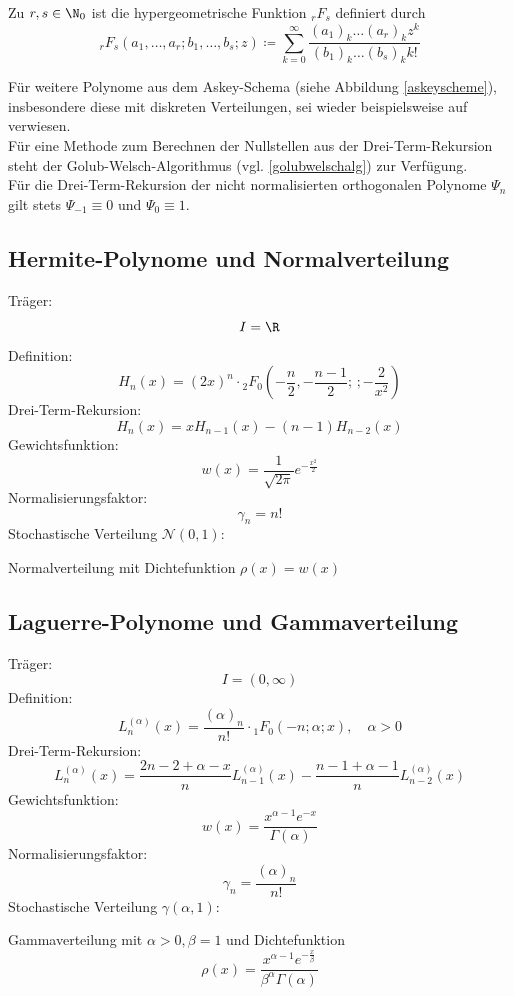 \begin{mathdef}
Zu $r,s\in\N_0$ ist die hypergeometrische Funktion $_rF_s$ definiert durch
\[_rF_s(a_1,\dots,a_r;b_1,\dots,b_s;z)\coloneqq \sum_{k=0}^\infty \frac{(a_1)_k\dots (a_r)_kz^k}{(b_1)_k\dots(b_s)_kk!}\]
\end{mathdef}
Für weitere Polynome aus dem Askey-Schema (siehe Abbildung \ref{askeyscheme}), insbesondere diese mit diskreten Verteilungen, sei wieder beispielsweise auf \autocite{dongbinxiu2010} verwiesen. \\
Für eine Methode zum Berechnen der Nullstellen aus der Drei-Term-Rekursion steht der Golub-Welsch-Algorithmus (vgl. \ref{golubwelschalg}) zur Verfügung.\\
Für die Drei-Term-Rekursion der nicht normalisierten orthogonalen Polynome $\Psi_n$ gilt stets $\Psi_{-1}\equiv 0$ und $\Psi_{0}\equiv 1$.
\subsection{Hermite-Polynome und Normalverteilung}
Träger:
\[I=\R\]
Definition:
\[H_n(x)=(2x)^n\cdot {_2F_0}\left(-\frac{n}{2},-\frac{n-1}{2};\, ;-\frac{2}{x^2}\right)\]
Drei-Term-Rekursion:
\[H_{n}(x)=xH_{n-1}(x)-(n-1)H_{n-2}(x)\]
Gewichtsfunktion:
\[w(x)=\frac{1}{\sqrt{2\pi}}e^{-\frac{x^2}{2}}\]
Normalisierungsfaktor:
\[\gamma_n=n!\]
Stochastische Verteilung $\mathcal{N}(0,1)$:
\begin{center}
Normalverteilung mit Dichtefunktion $\rho(x)=w(x)$
\end{center}

\subsection{Laguerre-Polynome und Gammaverteilung}
Träger:
\[I=(0,\infty)\]
Definition:
\[L_n^{(\alpha)}(x)=\frac{(\alpha)_n}{n!}\cdot {_1F_0}\left(-n;\alpha;x\right),\quad \alpha>0\]
Drei-Term-Rekursion:
\[L_{n}^{(\alpha)}(x)=\frac{2n-2+\alpha -x}{n}L_{n-1}^{(\alpha)}(x)-\frac{n-1+\alpha - 1}{n}L_{n-2}^{(\alpha)}(x)\]
Gewichtsfunktion:
\[w(x)=\frac{x^{\alpha-1}e^{-x}}{\Gamma(\alpha)}\]
Normalisierungsfaktor:
\[\gamma_n=\frac{(\alpha)_n}{n!}\]
Stochastische Verteilung $\gamma(\alpha,1)$:
\begin{center}
Gammaverteilung mit $\alpha>0,\beta=1$ und Dichtefunktion
\[\rho(x)=\frac{x^{\alpha-1}e^{-\frac{x}{\beta}}}{\beta^{\alpha}\Gamma(\alpha)}\]
\end{center}

